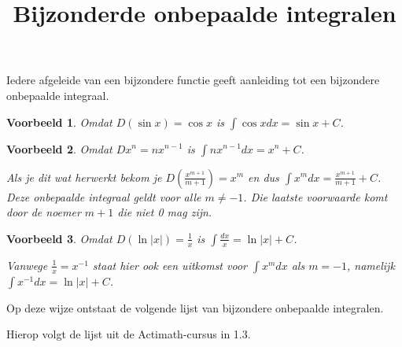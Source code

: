 \documentclass{article}
\title{Bijzonderde onbepaalde integralen}
\date { }
\newtheorem*{voorbeeld}{Voorbeeld}
\begin{document}
\maketitle \noindent

\noindent Iedere afgeleide van een bijzondere functie geeft aanleiding tot een bijzondere onbepaalde integraal.

\begin{voorbeeld} Omdat $D(\sin x)=\cos x$ is $\int \cos x dx = \sin x +C$.
\end{voorbeeld}

\begin{voorbeeld} Omdat $Dx^n=nx^{n-1}$ is $\int nx^{n-1}dx = x^n +C$.

\noindent Als je dit wat herwerkt bekom je $D \left( \frac{x^{m+1}}{m+1} \right) = x^m$ en dus $\int x^mdx=\frac{x^{m+1}}{m+1} + C$.
Deze onbepaalde integraal geldt voor alle $m \neq -1$.
Die laatste voorwaarde komt door de noemer $m+1$ die niet 0 mag zijn.
\end{voorbeeld}

\begin{voorbeeld} Omdat $D(\ln\vert x \vert)=\frac{1}{x}$ is $\int \frac{dx}{x} = \ln \vert x \vert +C$.

\noindent Vanwege $\frac{1}{x} = x^{-1}$ staat hier ook een uitkomst voor $\int x^m dx$ als $m=-1$, namelijk $\int x^{-1} dx = \ln \vert x \vert +C$.
\end{voorbeeld}

\noindent Op deze wijze ontstaat de volgende lijst van bijzondere onbepaalde integralen.

\noindent Hierop volgt de lijst uit de Actimath-cursus in 1.3.
\end{document}
